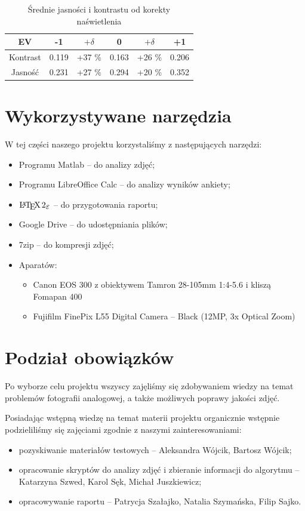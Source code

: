 \documentclass[options]{mwart}
\begin{document}
\begin{table}[h]
    \centering
    \begin{tabular}{|c|c|c|c|c|c|}
        \hline
        EV       & -1    & $+\delta$ & 0     & $+\delta$ & +1    \\ \hline
        Kontrast & 0.119 & +37 \%    & 0.163 & +26 \%    & 0.206 \\ \hline
        Jasność  & 0.231 & +27 \%    & 0.294 & +20 \%    & 0.352 \\ \hline
    \end{tabular}
    \caption{Średnie jasności i kontrastu od korekty naświetlenia}

\end{table}




\section{Wykorzystywane narzędzia}
W tej części naszego projektu korzystaliśmy z następujących narzędzi:
\begin{itemize}
    \item Programu Matlab -- do analizy zdjęć;
    \item Programu LibreOffice Calc -- do analizy wyników ankiety;
    \item $\LaTeXe{}$ -- do przygotowania raportu;
    \item Google Drive -- do udostępniania plików;
    \item 7zip -- do kompresji zdjęć;
    \item Aparatów:
          \begin{itemize}
              \item Canon EOS 300 z obiektywem Tamron 28-105mm 1:4-5.6 i kliszą Fomapan 400
              \item Fujifilm FinePix L55 Digital Camera -- Black (12MP, 3x Optical Zoom)
          \end{itemize}
\end{itemize}


\section{Podział obowiązków}
Po wyborze celu projektu wszyscy zajęliśmy się zdobywaniem wiedzy na
temat problemów fotografii analogowej, a także możliwych poprawy jakości zdjęć.\newline


Posiadając wstępną wiedzę na temat materii projektu organicznie wstępnie
podzieliliśmy się zajęciami zgodnie z naszymi zainteresowaniami: \newline
\begin{itemize}
    \item pozyskiwanie materiałów testowych -- Aleksandra Wójcik, Bartosz Wójcik;
    \item opracowanie skryptów do analizy zdjęć i zbieranie informacji do algorytmu -- Katarzyna Szwed, Karol Sęk, Michał Juszkiewicz;
    \item opracowywanie raportu -- Patrycja Szałajko, Natalia Szymańska, Filip Sajko.
\end{itemize}
\end{document}
